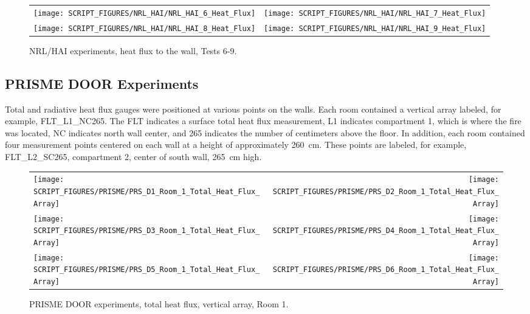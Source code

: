 \begin{figure}[p]
\begin{tabular*}{\textwidth}{l@{\extracolsep{\fill}}r}
\texttt{[image: SCRIPT\_FIGURES/NRL\_HAI/NRL\_HAI\_6\_Heat\_Flux]} &
\texttt{[image: SCRIPT\_FIGURES/NRL\_HAI/NRL\_HAI\_7\_Heat\_Flux]} \\
\texttt{[image: SCRIPT\_FIGURES/NRL\_HAI/NRL\_HAI\_8\_Heat\_Flux]} &
\texttt{[image: SCRIPT\_FIGURES/NRL\_HAI/NRL\_HAI\_9\_Heat\_Flux]}
\end{tabular*}
\label{NRL_HAI_2}
\caption[NRL/HAI experiments, heat flux to the wall, Tests 6-9]{NRL/HAI experiments, heat flux to the wall, Tests 6-9.}
\end{figure}



\clearpage

\subsection{PRISME DOOR Experiments}

Total and radiative heat flux gauges were positioned at various points on the walls. Each room contained a vertical array labeled, for example, FLT\_L1\_NC265. The FLT indicates a surface total heat flux measurement, L1 indicates compartment 1, which is where the fire was located, NC indicates north wall center, and 265 indicates the number of centimeters above the floor. In addition, each room contained four measurement points centered on each wall at a height of approximately 260~cm. These points are labeled, for example, FLT\_L2\_SC265, compartment 2, center of south wall, 265~cm high.

\begin{figure}[!ht]
\begin{tabular*}{\textwidth}{l@{\extracolsep{\fill}}r}
\texttt{[image: SCRIPT\_FIGURES/PRISME/PRS\_D1\_Room\_1\_Total\_Heat\_Flux\_Array]} &
\texttt{[image: SCRIPT\_FIGURES/PRISME/PRS\_D2\_Room\_1\_Total\_Heat\_Flux\_Array]} \\
\texttt{[image: SCRIPT\_FIGURES/PRISME/PRS\_D3\_Room\_1\_Total\_Heat\_Flux\_Array]} &
\texttt{[image: SCRIPT\_FIGURES/PRISME/PRS\_D4\_Room\_1\_Total\_Heat\_Flux\_Array]} \\
\texttt{[image: SCRIPT\_FIGURES/PRISME/PRS\_D5\_Room\_1\_Total\_Heat\_Flux\_Array]} &
\texttt{[image: SCRIPT\_FIGURES/PRISME/PRS\_D6\_Room\_1\_Total\_Heat\_Flux\_Array]}
\end{tabular*}
\caption[PRISME DOOR experiments, total heat flux, vertical array, Room 1]{PRISME DOOR experiments, total heat flux, vertical array, Room 1.}
\label{PRISME_Wall_Array_THF_Room_1}
\end{figure}

